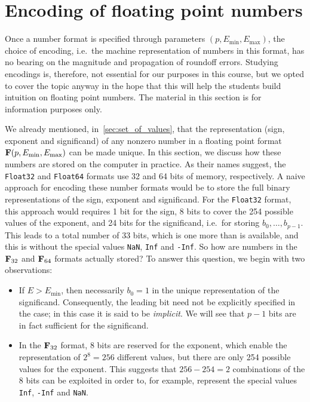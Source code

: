 
\section{Encoding of floating point numbers}%
\label{sec:encoding_of_floating_point_numbers}

Once a number format is specified through parameters $(p, E_{\min}, E_{\max})$,
the choice of encoding,
i.e.\ the machine representation of numbers in this format,
has no bearing on the magnitude and propagation of roundoff errors.
Studying encodings is, therefore, not essential for our purposes in this course,
but we opted to cover the topic anyway in the hope that this will help the students build intuition on floating point numbers.
The material in this section is for information purposes only.

We already mentioned, in~\cref{sec:set_of_values},
that the representation (sign, exponent and significand) of any nonzero number in a floating point format $\mathbf F(p, E_{\min}, E_{\max})$ can be made unique.
In this section,
we discuss how these numbers are stored on the computer in practice.
As their names suggest, the \texttt{Float32} and \texttt{Float64} formats use 32 and 64 bits of memory, respectively.
A naive approach for encoding these number formats would be to store the full binary representations of the sign, exponent and significand.
For the \texttt{Float32} format,
this approach would requires 1 bit for the sign,
8 bits to cover the 254 possible values of the exponent, and 24 bits for the significand,
i.e.\ for storing $b_0, \dots, b_{p-1}$.
This leads to a total number of 33 bits,
which is one more than is available,
and this is without the special values \texttt{NaN}, \texttt{Inf} and \texttt{-Inf}.
So how are numbers in the $\mathbf F_{32}$ and $\mathbf F_{64}$ formats actually stored?
To answer this question,
we begin with two observations:
\begin{itemize}
    \item
        If $E > E_{\min}$,
        then necessarily $b_0 = 1$ in the unique representation of the significand.
        Consequently, the leading bit need not be explicitly specified in the case;
        in this case it is said to be \emph{implicit}.
        We will see that $p-1$ bits are in fact sufficient for the significand.
    \item
        In the $\mathbf F_{32}$ format,
        8 bits are reserved for the exponent,
        which enable the representation of $2^8 = 256$ different values,
        but there are only 254 possible values for the exponent.
        This suggests that $256 - 254 = 2$ combinations of the 8 bits can be exploited in order to,
        for example, represent the special values \texttt{Inf}, \texttt{-Inf} and \texttt{NaN}.
\end{itemize}


